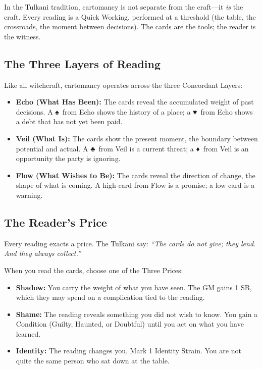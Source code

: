\documentclass[12pt,oneside]{book}
\renewcommand{\spadesuit}{♠}
\renewcommand{\heartsuit}{♥}
\renewcommand{\clubsuit}{♣}
\renewcommand{\diamondsuit}{♦}
\begin{document}
In the Tulkani tradition, cartomancy is not separate from the craft---it \textit{is} the craft. Every reading is a Quick Working, performed at a threshold (the table, the crossroads, the moment between decisions). The cards are the tools; the reader is the witness.

\subsection*{The Three Layers of Reading}

Like all witchcraft, cartomancy operates across the three Concordant Layers:

\begin{itemize}
    \item \textbf{Echo (What Has Been):} The cards reveal the accumulated weight of past decisions. A \spadesuit\ from Echo shows the history of a place; a \heartsuit\ from Echo shows a debt that has not yet been paid.
    \item \textbf{Veil (What Is):} The cards show the present moment, the boundary between potential and actual. A \clubsuit\ from Veil is a current threat; a \diamondsuit\ from Veil is an opportunity the party is ignoring.
    \item \textbf{Flow (What Wishes to Be):} The cards reveal the direction of change, the shape of what is coming. A high card from Flow is a promise; a low card is a warning.
\end{itemize}

\subsection*{The Reader's Price}

Every reading exacts a price. The Tulkani say: \textit{``The cards do not give; they lend. And they always collect.''}

When you read the cards, choose one of the Three Prices:

\begin{itemize}
    \item \textbf{Shadow:} You carry the weight of what you have seen. The GM gains 1 SB, which they may spend on a complication tied to the reading.
    \item \textbf{Shame:} The reading reveals something you did not wish to know. You gain a Condition (Guilty, Haunted, or Doubtful) until you act on what you have learned.
    \item \textbf{Identity:} The reading changes you. Mark 1 Identity Strain. You are not quite the same person who sat down at the table.
\end{itemize}
\end{document}
